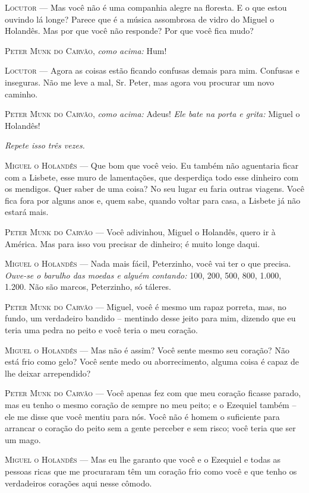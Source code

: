 \begin{myparindent}{0pt}
\begin{Parskip}
\textsc{Locutor} --- Mas você não é uma companhia alegre na floresta. E o que
estou ouvindo lá longe? Parece que é a música assombrosa de vidro do
Miguel o Holandês. Mas por que você não responde? Por que você fica
mudo?

\textsc{Peter Munk do Carvão}, \emph{como acima:} Hum!

\textsc{Locutor} --- Agora as coisas estão ficando confusas demais para mim.
Confusas e inseguras. Não me leve a mal, Sr. Peter, mas agora vou
procurar um novo caminho.

\textsc{Peter Munk do Carvão}, \emph{como acima:} Adeus! \emph{Ele bate na porta
e grita:} Miguel o Holandês!

\emph{Repete isso três vezes.}

\textsc{Miguel o Holandês} --- Que bom que você veio. Eu também não aguentaria
ficar com a Lisbete, esse muro de lamentações, que desperdiça todo esse
dinheiro com os mendigos. Quer saber de uma coisa? No seu lugar eu faria
outras viagens. Você fica fora por alguns anos e, quem sabe, quando
voltar para casa, a Lisbete já não estará mais.

\textsc{Peter Munk do Carvão} --- Você adivinhou, Miguel o Holandês, quero ir à
América. Mas para isso vou precisar de dinheiro; é muito longe daqui.

\textsc{Miguel o Holandês} --- Nada mais fácil, Peterzinho, você vai ter o que
precisa. \emph{Ouve-se o barulho das moedas e alguém contando:} 100,
200, 500, 800, 1.000, 1.200. Não são marcos, Peterzinho, só táleres.

\textsc{Peter Munk do Carvão} --- Miguel, você é mesmo um rapaz porreta, mas, no
fundo, um verdadeiro bandido -- mentindo desse jeito para mim, dizendo
que eu teria uma pedra no peito e você teria o meu coração.

\textsc{Miguel o Holandês} --- Mas não é assim? Você sente mesmo seu coração? Não
está frio como gelo? Você sente medo ou aborrecimento, alguma coisa é
capaz de lhe deixar arrependido?

\textsc{Peter Munk do Carvão} --- Você apenas fez com que meu coração ficasse
parado, mas eu tenho o mesmo coração de sempre no meu peito; e o
Ezequiel também -- ele me disse que você mentiu para nós. Você não é
homem o suficiente para arrancar o coração do peito sem a gente perceber
e sem risco; você teria que ser um mago.

\textsc{Miguel o Holandês} --- Mas eu lhe garanto que você e o Ezequiel e todas as
pessoas ricas que me procuraram têm um coração frio como você e que
tenho os verdadeiros corações aqui nesse cômodo.


\end{Parskip}
\end{myparindent}
